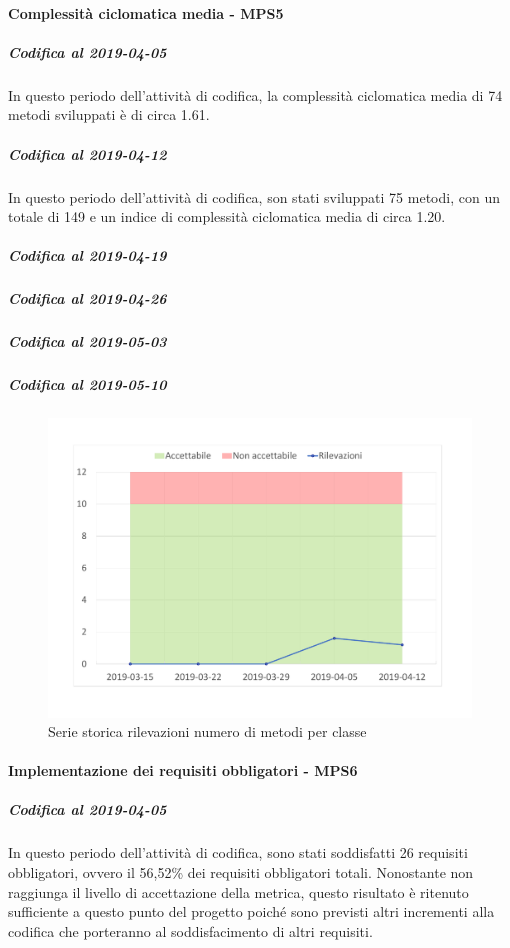 \paragraph{Complessità ciclomatica media - MPS5}
\subparagraph{Codifica al 2019-04-05}
In questo periodo dell'attività di codifica, la complessità ciclomatica media di 74 metodi sviluppati è di circa 1.61. 

\subparagraph{Codifica al 2019-04-12}
In questo periodo dell'attività di codifica, son stati sviluppati 75 metodi, con un totale di 149 e un indice di complessità ciclomatica media di circa 1.20.

\subparagraph{Codifica al 2019-04-19}

\subparagraph{Codifica al 2019-04-26}

\subparagraph{Codifica al 2019-05-03}

\subparagraph{Codifica al 2019-05-10}

\begin{figure}[H]
	\centering
	\includegraphics[scale=0.6]{images/resoconto/MPS5Chart.pdf}
	\caption{Serie storica rilevazioni numero di metodi per classe}	
\end{figure}


\paragraph{Implementazione dei requisiti obbligatori - MPS6}
\subparagraph{Codifica al 2019-04-05}
In questo periodo dell'attività di codifica, sono stati soddisfatti 26 requisiti obbligatori, ovvero il 56,52\% dei requisiti obbligatori totali.
Nonostante non raggiunga il livello di accettazione della
metrica, questo risultato è ritenuto sufficiente a questo punto del progetto poiché sono previsti altri incrementi alla codifica che porteranno al soddisfacimento di altri requisiti.

